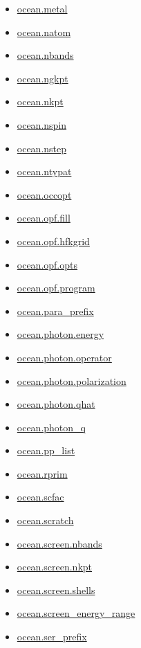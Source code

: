 \documentclass[11pt]{article}
\begin{document}
\begin{itemize}
\item \hyperref[kw:ocean-metal]{ocean.metal}
\item \hyperref[kw:ocean-natom]{ocean.natom}
\item \hyperref[kw:ocean-nbands]{ocean.nbands}
\item \hyperref[kw:ocean-ngkpt]{ocean.ngkpt}
\item \hyperref[kw:ocean-nkpt]{ocean.nkpt}
\item \hyperref[kw:ocean-nspin]{ocean.nspin}
\item \hyperref[kw:ocean-nstep]{ocean.nstep}
\item \hyperref[kw:ocean-ntypat]{ocean.ntypat}
\item \hyperref[kw:ocean-occopt]{ocean.occopt}
\item \hyperref[kw:ocean-opf-fill]{ocean.opf.fill}
\item \hyperref[kw:ocean-opf-hfkgrid]{ocean.opf.hfkgrid}
\item \hyperref[kw:ocean-opf-opts]{ocean.opf.opts}
\item \hyperref[kw:ocean-opf-program]{ocean.opf.program}
\item \hyperref[kw:ocean-para-prefix]{ocean.para\_prefix}
\item \hyperref[kw:ocean-photon-energy]{ocean.photon.energy}
\item \hyperref[kw:ocean-photon-operator]{ocean.photon.operator}
\item \hyperref[kw:ocean-photon-polarization]{ocean.photon.polarization}
\item \hyperref[kw:ocean-photon-qhat]{ocean.photon.qhat}
\item \hyperref[kw:ocean-photon-q]{ocean.photon\_q}
\item \hyperref[kw:ocean-pp-list]{ocean.pp\_list}
\item \hyperref[kw:ocean-rprim]{ocean.rprim}
\item \hyperref[kw:ocean-scfac]{ocean.scfac}
\item \hyperref[kw:ocean-scratch]{ocean.scratch}
\item \hyperref[kw:ocean-screen-nbands]{ocean.screen.nbands}
\item \hyperref[kw:ocean-screen-nkpt]{ocean.screen.nkpt}
\item \hyperref[kw:ocean-screen-shells]{ocean.screen.shells}
\item \hyperref[kw:ocean-screen-energy-range]{ocean.screen\_energy\_range}
\item \hyperref[kw:ocean-ser-prefix]{ocean.ser\_prefix}

\end{itemize}
\end{document}
